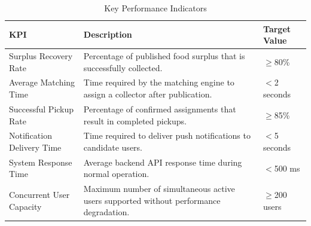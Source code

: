 \documentclass[conference]{IEEEtran}
\begin{document}
\begin{table}[!t]
\centering
\caption{Key Performance Indicators}
\label{tab:kpis}

\begin{tabular}{p{3.5cm} p{9cm} p{3cm}}
\toprule
\textbf{KPI} & \textbf{Description} & \textbf{Target Value} \\
\midrule
Surplus Recovery Rate & Percentage of published food surplus that is successfully collected. & $\geq$80\% \\

Average Matching Time & Time required by the matching engine to assign a collector after publication. & $<$2 seconds \\

Successful Pickup Rate & Percentage of confirmed assignments that result in completed pickups. & $\geq$85\% \\

Notification Delivery Time & Time required to deliver push notifications to candidate users. & $<$5 seconds \\

System Response Time & Average backend API response time during normal operation. & $<$500 ms \\

Concurrent User Capacity & Maximum number of simultaneous active users supported without performance degradation. & $\geq$200 users \\
\bottomrule
\end{tabular}

\end{table}
\end{document}
